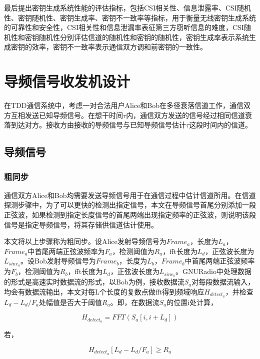 \documentclass[master]{seuthesis} %
\begin{document}
\begin{Main}
最后提出密钥生成系统性能的评估指标，包括CSI相关性、信息泄露率、CSI随机性、密钥随机性、密钥生成率、密钥不一致率等指标，用于衡量无线密钥生成系统的可靠性和安全性，CSI相关性和信息泄漏率表征第三方窃听信息的难度，CSI随机性和密钥随机性分别评估信道的随机性和密钥的随机性，密钥生成率表示系统生成密钥的效率，密钥不一致率表示通信双方调和前密钥的一致性。

\chapter{导频信号收发机设计}

在TDD通信系统中，考虑一对合法用户Alice和Bob在多径衰落信道工作，通信双方互相发送已知导频信号。在想干时间$\tau$内，通信双方发送的信号经过相同信道衰落到达对方。接收方由接收的导频信号与已知导频信号估计$\tau$这段时间内的信道。


\section{导频信号}

\subsection{粗同步}
通信双方Alice和Bob均需要发送导频信号用于在通信过程中估计信道所用。在信道探测步骤中，为了可以更快的检测出指定信号，本文在导频信号首尾分别添加一段正弦波，如果检测到指定长度信号的首尾两端出现指定频率的正弦波，则说明该段信号是指定导频信号，将其存储供信道估计使用。

本文将以上步骤称为粗同步。设Alice发射导频信号为$Frame_a$，长度为$L_a$，$Frame_a$中首尾两端正弦波频率为$F_a$，检测阈值为$R_a$，fft长度为$L_d$，正弦波长度为$L_{sine_a}$。设Bob发射导频信号为$Frame_b$，长度为$L_b$，$Frame_b$中首尾两端正弦波频率为$F_b$，检测阈值为$R_b$，fft长度为$L_d$，正弦波长度为$L_{sine_b}$。GNURadio中处理数据的形式是高速实时数据流的形式，以Bob为例，接收数据流$S_a$对每段数据流输入，均会有数据流输出，本文对每L个长度的复数点做fft得到频域响应$H_{detect_a}$，并检查$ L_d - L_d / F_a $处幅值是否大于阈值$R_a$。即，在数据流$S_a$的位置i处计算，

\begin{equation}
    H_{detect_a} = FFT(S_a[i, i+L_d])
\end{equation}

若，

\begin{equation}
    H_{detect_a}[L_d - L_d / F_a] \geq R_a 
\end{equation}


\end{Main}
\end{document}
